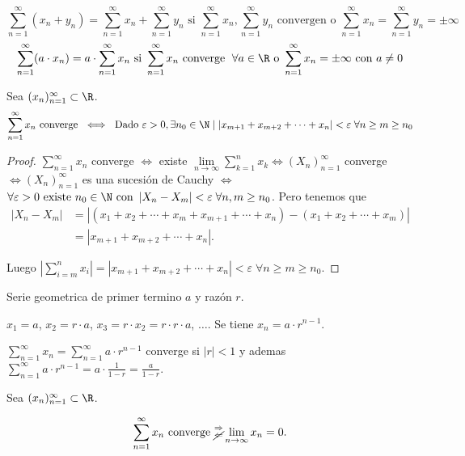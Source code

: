 \begin{remark}
	\[
		\sum_{n =1}^{\infty} (x_n + y_n) = \sum_{n =1}^{\infty} x_n + \sum_{n =1}^{\infty} y_n \text{ si } \sum_{n =1}^{\infty} x_n, \sum_{n =1}^{\infty} y_n \text{ convergen o } \sum_{n =1}^{\infty} x_n = \sum_{n =1}^{\infty} y_n = \pm \infty
	\]
	\[
		\sum_{n =1}^{\infty} (a \cdot x_n) = a \cdot \sum_{n =1}^{\infty} x_n \text{ si } \sum_{n =1}^{\infty} x_n \text{ converge }  \; \forall a \in \R \text{ o } \sum_{n =1}^{\infty} x_n = \pm \infty \text{ con } a \neq 0
	\]
\end{remark}
\begin{proposition}
	Sea \((x_n)^{\infty}_{n=1} \subset \R \).
	\[
		\sum_{n =1}^{\infty} x_n \text{ converge } \iff \text{ Dado } \varepsilon > 0, \exists n_{0 } \in \N \mid \left\vert x_{m+1} + x_{m+2} + \cdots + x_n  \right\vert < \varepsilon \;\forall n \geq m \geq n_0
	\]
\end{proposition}
\begin{proof}
	\(\sum_{n =1}^{\infty} x_n \) converge \(\iff \) existe \(\lim\limits_{n \to \infty} \sum_{k =1}^{n } x_k \iff (X_n)^{\infty}_{n=1}\) converge \(\iff (X_n)^{\infty}_{n=1}\) es una sucesión de Cauchy \( \iff\) \( \forall \varepsilon > 0 \text{ existe } n_0 \in \N \text{ con } \left\vert X_n - X_m  \right\vert < \varepsilon\; \forall n,m \geq n_0\). Pero tenemos que 
	\begin{align*}
		\left\vert X_n - X_m  \right\vert & = \left\vert (x_1 + x_2 + \cdots + x_m + x_{m+1} + \cdots + x_n) - (x_1 + x_2 + \cdots + x_m) \right\vert \\ & = \left\vert x_{m+1} + x_{m+2} + \cdots + x_n  \right\vert. 
	\end{align*}
	
	Luego \(\left\vert \sum_{i=m }^{n } x_i \right\vert = \left\vert x_{m+1} + x_{m+2} + \cdots + x_n  \right\vert < \varepsilon \; \forall n \geq m \geq n_0 \).
\end{proof}
\begin{example}
	Serie geometrica de primer termino \( a \) y razón \(r \).
	
	\(x_1 = a\), \(x_2 = r \cdot a \), \(x_3 = r \cdot x_2 = r \cdot r \cdot a\), \(\ldots \). Se tiene \(x_n =a \cdot r^{n-1} \).
	
	\(\sum_{n =1}^{\infty} x_n = \sum_{n =1}^{\infty} a \cdot r^{n - 1 } \) converge si \(|r| < 1 \) y ademas \(\sum_{n =1}^{\infty} a \cdot r^{n-1} = a \cdot \frac{1}{1-r} = \frac{a }{1 - r} \).
\end{example}
\begin{proposition}
	Sea \((x_n)^{\infty}_{n=1} \subset \R \).
	
	\[
		\sum_{n =1}^{\infty} x_n \text{ converge } \substack{\Rightarrow \\ \cancel \Leftarrow} \lim\limits_{n \to \infty} x_n = 0.
	\]
\end{proposition}
